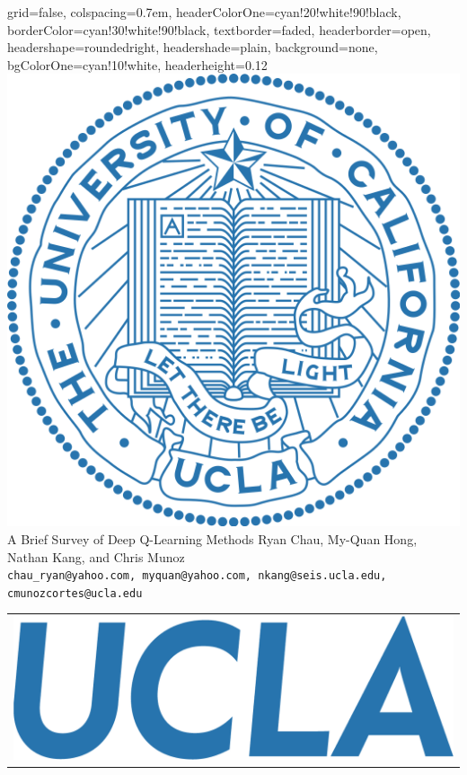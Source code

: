 \documentclass[landscape,a0paper,fontscale=0.32]{baposter}
\begin{document}
\begin{poster}{
    grid=false,
    colspacing=0.7em,
    headerColorOne=cyan!20!white!90!black,
    borderColor=cyan!30!white!90!black,
    textborder=faded,
    headerborder=open,
    headershape=roundedright,
    headershade=plain,
    background=none,
    bgColorOne=cyan!10!white,
    headerheight=0.12\textheight
}
    {
         \includegraphics[height=0.1\textheight]{ucla_campus_seal}
    }
    {\sc\Huge A Brief Survey of Deep Q-Learning Methods}
    {Ryan Chau, My-Quan Hong, Nathan Kang, and Chris Munoz\\[0.5em]
    {\texttt{chau\_ryan@yahoo.com, myquan@yahoo.com, nkang@seis.ucla.edu,
    cmunozcortes@ucla.edu}}}
    {
     \begin{tabular}{r}
       \includegraphics[height=0.05\textheight]{logo_UCLA_blue}
     \end{tabular}
    }


\end{poster}
\end{document}
